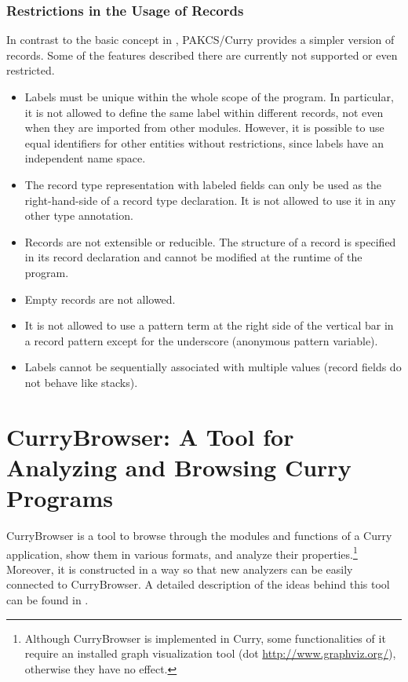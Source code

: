 \documentclass[11pt,fleqn]{article}
\newcommand{\cb}{CurryBrowser\xspace}
\begin{document}
\subsubsection{Restrictions in the Usage of Records}
\label{sec-restrinrecs}

In contrast to the basic concept in \cite{Leijen05}, PAKCS/Curry provides a
simpler version of records. Some of the features described there are
currently not supported or even restricted.

\begin{itemize}
\item Labels must be unique within the whole scope of the program.
  In particular, it is not allowed to define the same label within
  different records, not even when they are imported from other
  modules. However, it is possible to use equal identifiers for other
  entities without restrictions, since labels have an independent 
  name space.
\item The record type representation with labeled fields can only be
  used as the right-hand-side of a record type declaration. It is
  not allowed to use it in any other type annotation.
\item Records are not extensible or reducible. The structure of a
  record is specified in its record declaration and cannot be
  modified at the runtime of the program.
\item Empty records are not allowed.
\item It is not allowed  to use a pattern term
  at the right side of the vertical bar in a record pattern
  except for the underscore (anonymous pattern variable).
\item Labels cannot be sequentially associated with multiple values
  (record fields do not behave like stacks).
\end{itemize}


\newpage



\newpage

\section{\cb: A Tool for Analyzing and Browsing Curry Programs}
\label{sec-currybrowser}

\cb is a tool to browse through the modules and functions
of a Curry application, show them in various formats,
and analyze their properties.\footnote{Although \cb is
implemented in Curry, some functionalities of it require an
installed graph visualization tool (dot \url{http://www.graphviz.org/}),
otherwise they have no effect.}
Moreover, it is constructed in a way so that
new analyzers can be easily connected to \cb.
A detailed description of the ideas behind this tool can be
found in \cite{Hanus05WCFLP,Hanus06WLPE}.
\end{document}
